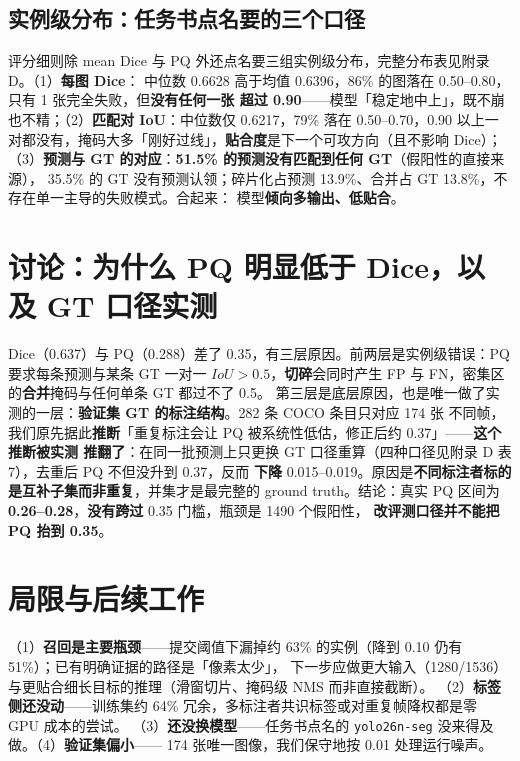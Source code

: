 \documentclass{article}
\begin{document}
\subsection{实例级分布：任务书点名要的三个口径}
评分细则除 mean Dice 与 PQ 外还点名要三组实例级分布，完整分布表见附录 D。（1）\textbf{每图 Dice}：
中位数 0.6628 高于均值 0.6396，86\% 的图落在 0.50--0.80，只有 1 张完全失败，但\textbf{没有任何一张
超过 0.90}——模型「稳定地中上」，既不崩也不精；（2）\textbf{匹配对 IoU}：中位数仅 0.6217，79\% 落在
0.50--0.70，0.90 以上一对都没有，掩码大多「刚好过线」，\textbf{贴合度}是下一个可攻方向（且不影响 Dice）；
（3）\textbf{预测与 GT 的对应}：\textbf{51.5\% 的预测没有匹配到任何 GT}（假阳性的直接来源），
35.5\% 的 GT 没有预测认领；碎片化占预测 13.9\%、合并占 GT 13.8\%，不存在单一主导的失败模式。合起来：
模型\textbf{倾向多输出、低贴合}。

\section{讨论：为什么 PQ 明显低于 Dice，以及 GT 口径实测}
\label{sec:discussion}
Dice（0.637）与 PQ（0.288）差了 0.35，有三层原因。前两层是实例级错误：PQ 要求每条预测与某条 GT
一对一 $IoU>0.5$，\textbf{切碎}会同时产生 FP 与 FN，密集区的\textbf{合并}掩码与任何单条 GT 都过不了 0.5。
第三层是底层原因，也是唯一做了实测的一层：\textbf{验证集 GT 的标注结构}。282 条 COCO 条目只对应 174 张
不同帧，我们原先据此\textbf{推断}「重复标注会让 PQ 被系统性低估，修正后约 0.37」——\textbf{这个推断被实测
推翻了}：在同一批预测上只更换 GT 口径重算（四种口径见附录 D 表 7），去重后 PQ 不但没升到 0.37，反而
\textbf{下降} 0.015--0.019。原因是\textbf{不同标注者标的是互补子集而非重复}，并集才是最完整的 ground
truth。结论：真实 PQ 区间为 \textbf{0.26--0.28}，\textbf{没有跨过} 0.35 门槛，瓶颈是 1490 个假阳性，
\textbf{改评测口径并不能把 PQ 抬到 0.35}。

\section{局限与后续工作}
（1）\textbf{召回是主要瓶颈}——提交阈值下漏掉约 63\% 的实例（降到 0.10 仍有 51\%）；已有明确证据的路径是「像素太少」，
下一步应做更大输入（1280/1536）与更贴合细长目标的推理（滑窗切片、掩码级 NMS 而非直接截断）。
（2）\textbf{标签侧还没动}——训练集约 64\% 冗余，多标注者共识标签或对重复帧降权都是零 GPU 成本的尝试。
（3）\textbf{还没换模型}——任务书点名的 \texttt{yolo26n-seg} 没来得及做。（4）\textbf{验证集偏小}——
174 张唯一图像，我们保守地按 0.01 处理运行噪声。
\end{document}

